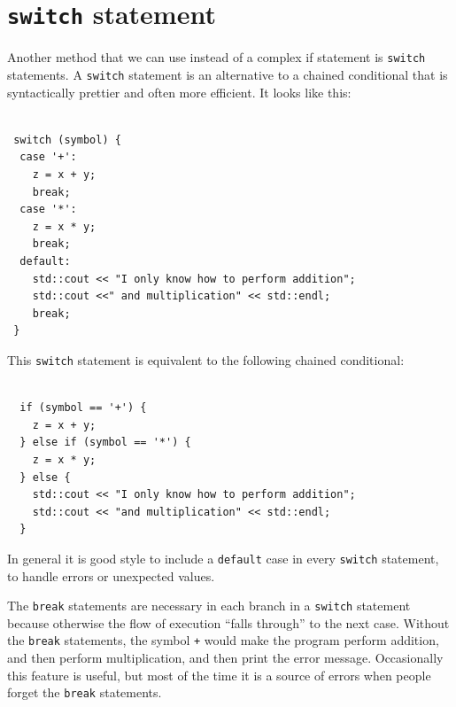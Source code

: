 \section{{\tt switch} statement}
\label{switch}

Another method that we can use instead of a complex if statement is {\tt switch}
statements.  A {\tt switch} statement
is an alternative to a chained conditional that is syntactically
prettier and often more efficient.  It looks like this:

\begin{lstlisting}
  
 switch (symbol) {
  case '+':
    z = x + y;
    break;
  case '*':
    z = x * y;
    break;
  default:
    std::cout << "I only know how to perform addition";
    std::cout <<" and multiplication" << std::endl;
    break;
 }
\end{lstlisting}
%
This {\tt switch} statement is equivalent to the following chained
conditional:

\begin{lstlisting}
  
  if (symbol == '+') {
    z = x + y;
  } else if (symbol == '*') {
    z = x * y;
  } else {
    std::cout << "I only know how to perform addition";
    std::cout << "and multiplication" << std::endl;
  }
\end{lstlisting}
%
In general it is good style to include a {\tt default} case in
every {\tt switch} statement, to handle errors or unexpected values.

The {\tt break} statements are necessary in each branch
in a {\tt switch} statement because otherwise the flow of execution
``falls through'' to the next case.  Without the {\tt break} statements,
the symbol {\tt +} would make the program perform addition, and
then perform multiplication, and then print the error message.
Occasionally this feature is useful, but most of the time it is
a source of errors when people forget the {\tt break} statements.



